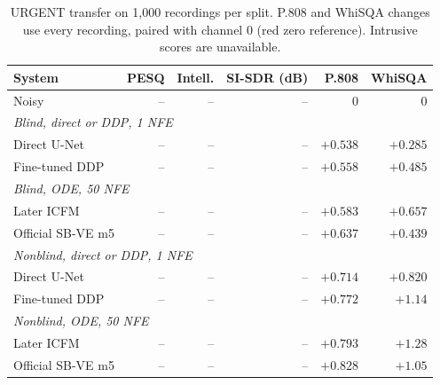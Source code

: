 \begin{table}[htbp]\centering\small
\setlength{\tabcolsep}{4pt}
\begin{tabular}{lrrrrr}\toprule
System & PESQ & Intell. & SI-SDR (dB) & P.808 & WhiSQA \\ \midrule
\rowcolor{worstred}Noisy & -- & -- & -- & 0 & 0 \\
\midrule\multicolumn{6}{l}{\itshape Blind, direct or DDP, 1 NFE} \\
Direct U-Net & -- & -- & -- & \cellcolor{worstred}$+0.538$ & \cellcolor{worstred}$+0.285$ \\
Fine-tuned DDP & -- & -- & -- & \cellcolor{bestblue}$+0.558$ & \cellcolor{bestblue}$+0.485$ \\
\midrule\multicolumn{6}{l}{\itshape Blind, ODE, 50 NFE} \\
Later ICFM & -- & -- & -- & \cellcolor{worstred}$+0.583$ & \cellcolor{bestblue}$+0.657$ \\
Official SB-VE m5 & -- & -- & -- & \cellcolor{bestblue}$+0.637$ & \cellcolor{worstred}$+0.439$ \\
\midrule\multicolumn{6}{l}{\itshape Nonblind, direct or DDP, 1 NFE} \\
Direct U-Net & -- & -- & -- & \cellcolor{worstred}$+0.714$ & \cellcolor{worstred}$+0.820$ \\
Fine-tuned DDP & -- & -- & -- & \cellcolor{bestblue}$+0.772$ & \cellcolor{bestblue}$+1.14$ \\
\midrule\multicolumn{6}{l}{\itshape Nonblind, ODE, 50 NFE} \\
Later ICFM & -- & -- & -- & \cellcolor{worstred}$+0.793$ & \cellcolor{bestblue}$+1.28$ \\
Official SB-VE m5 & -- & -- & -- & \cellcolor{bestblue}$+0.828$ & \cellcolor{worstred}$+1.05$ \\
\bottomrule\end{tabular}
\caption{URGENT transfer on 1,000 recordings per split. P.808 and WhiSQA changes use every recording, paired with channel 0 (red zero reference). Intrusive scores are unavailable.}\label{tab:cfmse-urgent}
\end{table}
